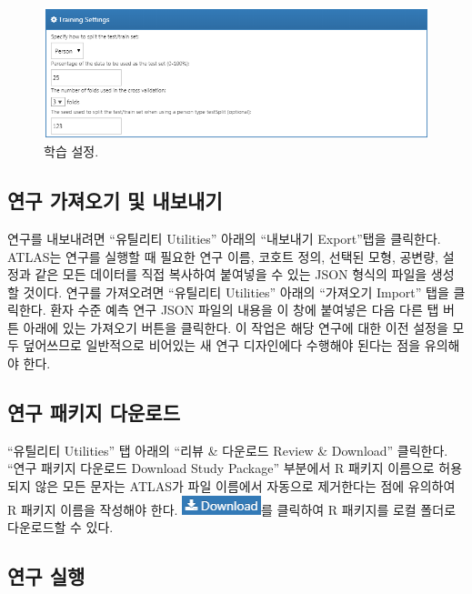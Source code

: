 \documentclass[10.5pt]{book}
\theoremstyle{definition}
\theoremstyle{definition}
\theoremstyle{definition}
\theoremstyle{remark}
\begin{document}
\begin{figure}

{\centering \includegraphics[width=1\linewidth]{images/PatientLevelPrediction/trainingSettings} 

}

\caption{학습 설정.}\label{fig:trainingSettings}
\end{figure}

\subsection{연구 가져오기 및 내보내기}\label{---}

연구를 내보내려면 ``유틸리티 Utilities'' 아래의 ``내보내기 Export''탭을
클릭한다. ATLAS는 연구를 실행할 때 필요한 연구 이름, 코호트 정의, 선택된
모형, 공변량, 설정과 같은 모든 데이터를 직접 복사하여 붙여넣을 수 있는
JSON 형식의 파일을 생성할 것이다. 연구를 가져오려면 ``유틸리티
Utilities'' 아래의 ``가져오기 Import'' 탭을 클릭한다. 환자 수준 예측
연구 JSON 파일의 내용을 이 창에 붙여넣은 다음 다른 탭 버튼 아래에 있는
가져오기 버튼을 클릭한다. 이 작업은 해당 연구에 대한 이전 설정을 모두
덮어쓰므로 일반적으로 비어있는 새 연구 디자인에다 수행해야 된다는 점을
유의해야 한다.

\subsection{연구 패키지 다운로드}\label{--}

``유틸리티 Utilities'' 탭 아래의 ``리뷰 \& 다운로드 Review \& Download''
클릭한다. ``연구 패키지 다운로드 Download Study Package'' 부분에서 R
패키지 이름으로 허용되지 않은 모든 문자는 ATLAS가 파일 이름에서 자동으로
제거한다는 점에 유의하여 R 패키지 이름을 작성해야 한다.
\includegraphics{images/PatientLevelPrediction/download.png}를 클릭하여
R 패키지를 로컬 폴더로 다운로드할 수 있다.

\subsection{연구 실행}\label{-}
\end{document}

